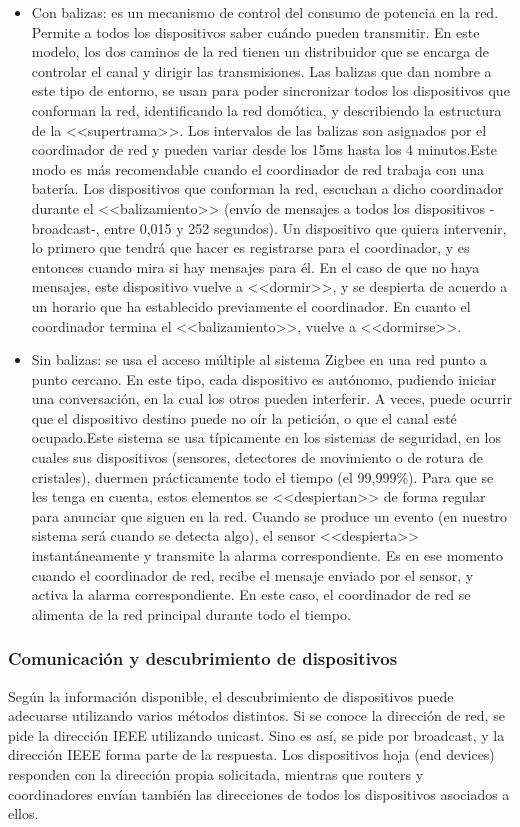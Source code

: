 \begin{itemize}
\item Con balizas: es un mecanismo de control del consumo de potencia en la red. Permite a todos los dispositivos saber
cu\'ando pueden transmitir. En este modelo, los dos caminos de la red tienen un distribuidor que se encarga de controlar
el canal y dirigir las transmisiones. Las balizas que dan nombre a este tipo de entorno, se usan para poder sincronizar
todos los dispositivos que conforman la red, identificando la red dom\'otica, y describiendo la estructura de la
<<supertrama>>. Los intervalos de las balizas son asignados por el coordinador de red y
pueden variar desde los 15ms hasta los 4 minutos.Este modo es m\'as recomendable cuando el coordinador de red trabaja con
una bater\'ia. Los dispositivos que conforman la red, escuchan a dicho coordinador durante el
<<balizamiento>> (env\'io de mensajes a todos los dispositivos -broadcast-, entre 0,015 y 252
segundos). Un dispositivo que quiera intervenir, lo primero que tendr\'a que hacer es registrarse para el coordinador, y
es entonces cuando mira si hay mensajes para \'el. En el caso de que no haya mensajes, este dispositivo vuelve a
<<dormir>>, y se despierta de acuerdo a un horario que ha establecido previamente el
coordinador. En cuanto el coordinador termina el <<balizamiento>>, vuelve a
<<dormirse>>.
\item Sin balizas: se usa el acceso m\'ultiple al sistema Zigbee en una red punto a punto cercano. En este tipo, cada
dispositivo es aut\'onomo, pudiendo iniciar una conversaci\'on, en la cual los otros pueden interferir. A veces, puede
ocurrir que el dispositivo destino puede no o\'ir la petici\'on, o que el canal est\'e ocupado.Este sistema se usa
t\'ipicamente en los sistemas de seguridad, en los cuales sus dispositivos (sensores, detectores de movimiento o de
rotura de cristales), duermen pr\'acticamente todo el tiempo (el 99,999\%). Para que se les tenga en cuenta, estos
elementos se <<despiertan>> de forma regular para anunciar que siguen en la red. Cuando se
produce un evento (en nuestro sistema ser\'a cuando se detecta algo), el sensor <<despierta>>
instant\'aneamente y transmite la alarma correspondiente. Es en ese momento cuando el coordinador de red, recibe el
mensaje enviado por el sensor, y activa la alarma correspondiente. En este caso, el coordinador de red se alimenta de
la red principal durante todo el tiempo.
\end{itemize}

\subsubsection{Comunicaci\'on y descubrimiento de dispositivos}
Seg\'un la informaci\'on disponible, el descubrimiento de dispositivos puede adecuarse utilizando varios m\'etodos distintos.
Si se conoce la direcci\'on de red, se pide la direcci\'on IEEE utilizando unicast. Sino es as\'i, se pide por broadcast, y
la direcci\'on IEEE forma parte de la respuesta. Los dispositivos hoja (end devices) responden con la direcci\'on propia
solicitada, mientras que routers y coordinadores env\'ian tambi\'en las direcciones de todos los dispositivos asociados a
ellos.

